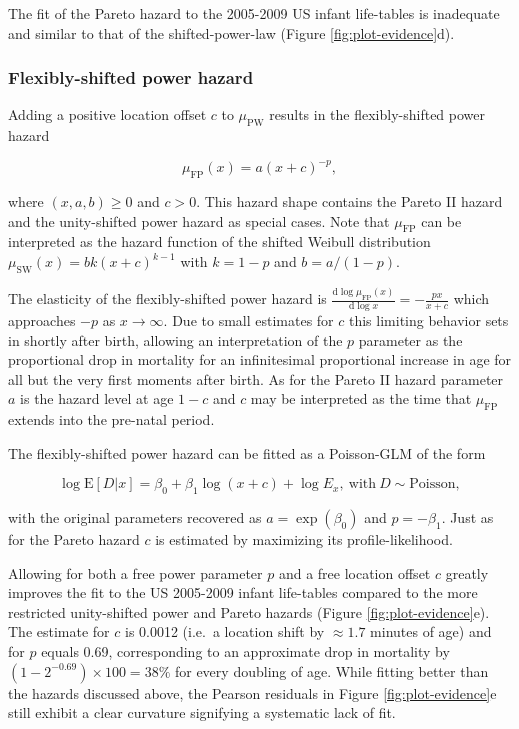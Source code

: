 \documentclass[10pt, twoside, parskip=half]{article}
\begin{document}
The fit of the Pareto hazard to the 2005-2009 US infant life-tables is
inadequate and similar to that of the shifted-power-law (Figure
\ref{fig:plot-evidence}d).

\subsubsection*{Flexibly-shifted power
hazard}\label{flexibly-shifted-power-hazard}

Adding a positive location offset \(c\) to \(\mu_\text{PW}\) results in
the flexibly-shifted power hazard

\[
\mu_\text{FP}(x) = a(x+c)^{-p},
\]

where \((x,a,b)\geq 0\) and \(c > 0\). This hazard shape contains the
Pareto II hazard and the unity-shifted power hazard as special cases.
Note that \(\mu_\text{FP}\) can be interpreted as the hazard function of
the shifted Weibull distribution \(\mu_\text{SW}(x)=bk(x+c)^{k-1}\) with
\(k=1-p\) and \(b=a/(1-p)\).

The elasticity of the flexibly-shifted power hazard is
\(\frac{\text{d}\log\mu_\text{FP}(x)}{\text{d}\log x}=-\frac{px}{x+c}\)
which approaches \(-p\) as \(x\rightarrow\infty\). Due to small
estimates for \(c\) this limiting behavior sets in shortly after birth,
allowing an interpretation of the \(p\) parameter as the proportional
drop in mortality for an infinitesimal proportional increase in age for
all but the very first moments after birth. As for the Pareto II hazard
parameter \(a\) is the hazard level at age \(1-c\) and \(c\) may be
interpreted as the time that \(\mu_\text{FP}\) extends into the
pre-natal period.

The flexibly-shifted power hazard can be fitted as a Poisson-GLM of the
form

\[
\log\text{E}[D|x] = \beta_0 + \beta_1\log(x+c) + \log E_x,~\text{with}~D\sim\text{Poisson},
\]

with the original parameters recovered as \(a = \exp(\beta_0)\) and
\(p = -\beta_1\). Just as for the Pareto hazard \(c\) is estimated by
maximizing its profile-likelihood.

Allowing for both a free power parameter \(p\) and a free location
offset \(c\) greatly improves the fit to the US 2005-2009 infant
life-tables compared to the more restricted unity-shifted power and
Pareto hazards (Figure \ref{fig:plot-evidence}e). The estimate for \(c\)
is 0.0012 (i.e.~a location shift by \(\approx1.7\) minutes of age) and
for \(p\) equals 0.69, corresponding to an approximate drop in mortality
by \((1-2^{-0.69})\times100=38 \%\) for every doubling of age. While
fitting better than the hazards discussed above, the Pearson residuals
in Figure \ref{fig:plot-evidence}e still exhibit a clear curvature
signifying a systematic lack of fit.
\end{document}
